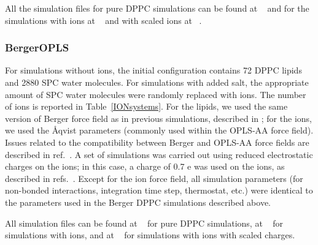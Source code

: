\documentclass[twoside,twocolumn,9pt]{article}
\begin{document}
All the simulation files for pure DPPC simulations can be found at ~\cite{bergerDPPCfiles} and for the simulations with ions at 
~\cite{bergerDPPC150mMfiles, bergerDPPC1000mMfiles} 
and with scaled ions at ~\cite{DPPCBergerNaCl150mMscaled, DPPCBergerNaCl1000mMscaled}.



\subsubsection{BergerOPLS}
For simulations without ions, the initial configuration contains 72 DPPC lipids and 2880 SPC water molecules. For simulations with added salt, the appropriate amount of SPC water molecules were randomly replaced with ions. The number of ions is reported in Table~\ref{IONsystems}.
For the lipids, we used the same version of Berger force field as in previous simulations, described in \cite{berger97}; for the ions, we used the \r{A}qvist parameters \cite{aqvist90} (commonly used within the OPLS-AA force field). Issues related to the compatibility between Berger and OPLS-AA force fields are described in ref.~\cite{tieleman06}. 
A set of simulations was carried out using reduced electrostatic charges on the ions; in this case, a charge of 0.7 e was used on the ions, as described in refs.~\cite{kohagen16, leontyev11}. Except for the ion force field, all simulation parameters (for non-bonded interactions, integration time step, thermostat, etc.) were identical to the parameters used in the Berger DPPC simulations described above.

All simulation files can be found at ~\cite{bergerOPLSDPPCfiles} for pure DPPC simulations, 
at ~\cite{bergerOPLSDPPCfiles150mMnacl, bergerOPLSDPPCfiles1000mMnacl} for simulations with ions,
and at ~\cite{DPPCBergerOPLS06NaCl150mMscaled, DPPCBergerOPLS06NaCl1000mMscaled} for simulations with ions with scaled charges. 
\end{document}
